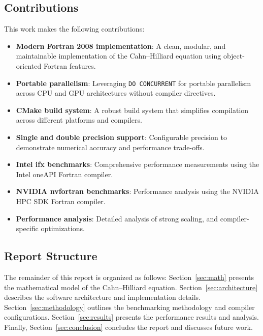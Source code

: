 \documentclass[11pt,a4paper]{article}
\begin{document}
	\subsection{Contributions}
	
	This work makes the following contributions:
	
	\begin{itemize}
		\item \textbf{Modern Fortran 2008 implementation}: A clean, modular, and maintainable implementation of the Cahn–Hilliard equation using object-oriented Fortran features.
		
		\item \textbf{Portable parallelism}: Leveraging \texttt{DO CONCURRENT} for portable parallelism across CPU and GPU architectures without compiler directives.
		
		\item \textbf{CMake build system}: A robust build system that simplifies compilation across different platforms and compilers.
		
		\item \textbf{Single and double precision support}: Configurable precision to demonstrate numerical accuracy and performance trade-offs.
		
		\item \textbf{Intel ifx benchmarks}: Comprehensive performance measurements using the Intel oneAPI Fortran compiler.
		
		\item \textbf{NVIDIA nvfortran benchmarks}: Performance analysis using the NVIDIA HPC SDK Fortran compiler.
		
		\item \textbf{Performance analysis}: Detailed analysis of strong scaling, and compiler-specific optimizations.
	\end{itemize}
	
	\subsection{Report Structure}
	
	The remainder of this report is organized as follows: Section~\ref{sec:math} presents the mathematical model of the Cahn–Hilliard equation. Section~\ref{sec:architecture} describes the software architecture and implementation details. Section~\ref{sec:methodology} outlines the benchmarking methodology and compiler configurations. Section~\ref{sec:results} presents the performance results and analysis. Finally, Section~\ref{sec:conclusion} concludes the report and discusses future work.
	
\end{document}
